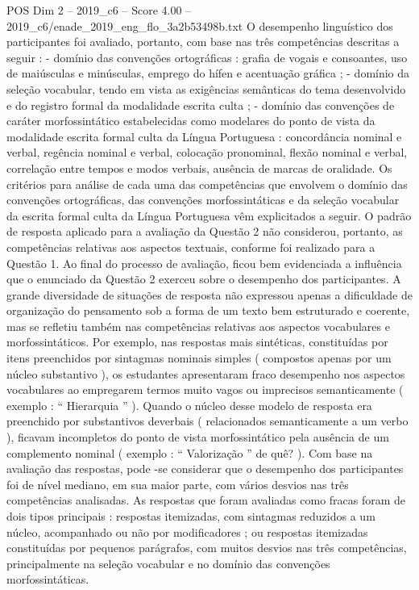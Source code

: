 \begin{textsample}{POS Dim 2 – 2019\_c6 – Score 4.00 – 2019\_c6/enade\_2019\_eng\_flo\_3a2b53498b.txt}
O desempenho linguístico dos participantes foi avaliado, portanto, com base nas três competências descritas a seguir : - domínio das convenções ortográficas : grafia de vogais e consoantes, uso de maiúsculas e minúsculas, emprego do hífen e acentuação gráfica ; - domínio da seleção vocabular, tendo em vista as exigências semânticas do tema desenvolvido e do registro formal da modalidade escrita culta ; - domínio das convenções de caráter morfossintático estabelecidas como modelares do ponto de vista da modalidade escrita formal culta da Língua Portuguesa : concordância nominal e verbal, regência nominal e verbal, colocação pronominal, flexão nominal e verbal, correlação entre tempos e modos verbais, ausência de marcas de oralidade.
Os critérios para análise de cada uma das competências que envolvem o domínio das convenções ortográficas, das convenções morfossintáticas e da seleção vocabular da escrita formal culta da Língua Portuguesa vêm explicitados a seguir.
O padrão de resposta aplicado para a avaliação da Questão 2 não considerou, portanto, as competências relativas aos aspectos textuais, conforme foi realizado para a Questão 1.
Ao final do processo de avaliação, ficou bem evidenciada a influência que o enunciado da Questão 2 exerceu sobre o desempenho dos participantes.
A grande diversidade de situações de resposta não expressou apenas a dificuldade de organização do pensamento sob a forma de um texto bem estruturado e coerente, mas se refletiu também nas competências relativas aos aspectos vocabulares e morfossintáticos.
Por exemplo, nas respostas mais sintéticas, constituídas por itens preenchidos por sintagmas nominais simples ( compostos apenas por um núcleo substantivo ), os estudantes apresentaram fraco desempenho nos aspectos vocabulares ao empregarem termos muito vagos ou imprecisos semanticamente ( exemplo : “ Hierarquia ” ).
Quando o núcleo desse modelo de resposta era preenchido por substantivos deverbais ( relacionados semanticamente a um verbo ), ficavam incompletos do ponto de vista morfossintático pela ausência de um complemento nominal ( exemplo : “ Valorização ” de quê? ).
Com base na avaliação das respostas, pode -se considerar que o desempenho dos participantes foi de nível mediano, em sua maior parte, com vários desvios nas três competências analisadas.
As respostas que foram avaliadas como fracas foram de dois tipos principais : respostas itemizadas, com sintagmas reduzidos a um núcleo, acompanhado ou não por modificadores ; ou respostas itemizadas constituídas por pequenos parágrafos, com muitos desvios nas três competências, principalmente na seleção vocabular e no domínio das convenções morfossintáticas.

\end{textsample}

